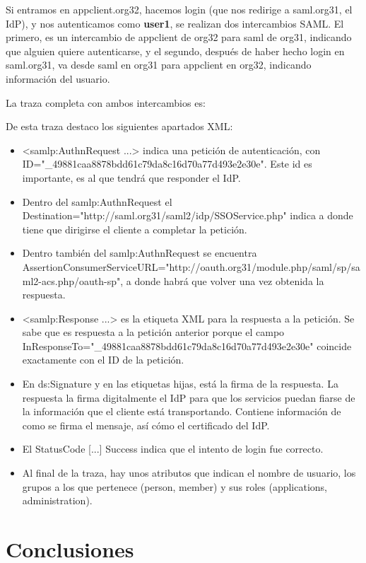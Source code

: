 \documentclass[]{article}
\begin{document}
Si entramos en appclient.org32, hacemos login (que nos redirige a saml.org31, el IdP), y nos autenticamos como \textbf{user1}, se realizan dos intercambios SAML. El primero, es un intercambio de appclient de org32 para saml de org31, indicando que alguien quiere autenticarse, y el segundo, después de haber hecho login en saml.org31, va desde saml en org31 para appclient en org32, indicando información del usuario.

La traza completa con ambos intercambios es:


De esta traza destaco los siguientes apartados XML:

\begin{itemize}
	\item <samlp:AuthnRequest ...> indica una petición de autenticación, con ID="\_49881caa8878bdd61c79da8c16d70a77d493e2e30e". Este id es importante, es al que tendrá que responder el IdP.
	\item Dentro del samlp:AuthnRequest el Destination="http://saml.org31/saml2/idp/SSOService.php" indica a donde tiene que dirigirse el cliente a completar la petición.
	\item Dentro también del samlp:AuthnRequest se encuentra AssertionConsumerServiceURL="http://oauth.org31/module.php/saml/sp/saml2-acs.php/oauth-sp", a donde habrá que volver una vez obtenida la respuesta.
	\item <samlp:Response ...> es la etiqueta XML para la respuesta a la petición. Se sabe que es respuesta a la petición anterior porque el campo InResponseTo="\_49881caa8878bdd61c79da8c16d70a77d493e2e30e" coincide exactamente con el ID de la petición.
	\item En ds:Signature y en las etiquetas hijas, está la firma de la respuesta. La respuesta la firma digitalmente el IdP para que los servicios puedan fiarse de la información que el cliente está transportando. Contiene información de como se firma el mensaje, así cómo el certificado del IdP.
	\item El StatusCode [...] Success indica que el intento de login fue correcto. 
	\item Al final de la traza, hay unos atributos que indican el nombre de usuario, los grupos a los que pertenece (person, member) y sus roles (applications, administration).
\end{itemize}

\section{Conclusiones}
\end{document}
